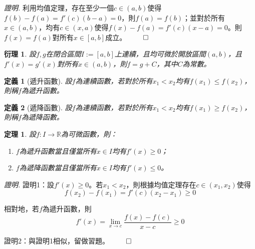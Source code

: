 \documentclass[12pt]{article}
\newtheorem{definition}{定義}
\newtheorem*{theorem}{定理}
\newtheorem*{corollary}{衍理}
\renewenvironment*{proof}{\textit{證明.}}{\hfill$\qed$}
\begin{document}
    \begin{proof}
        利用均值定理，存在至少一個$c\in(a,b)$使得$f(b)-f(a)=f'(c)(b-a)=0$，則$f(a)=f(b)$；並對於所有$x\in(a,b)$，均有$c\in(x,a)$使得$f(x)-f(a)=f'(c)(x-a)=0$。則$f(x)=f(a)$對所有$x\in[a,b]$成立。
    \end{proof}

    \begin{corollary}
        設$f,g$在閉合區間$I:=[a,b]$上連續，且均可微於開放區間$(a,b)$，且$f'(x)=g'(x)$對所有$x\in(a,b)$，則$f=g+C$，其中$C$為常數。
    \end{corollary}

    \begin{definition}[遞升函數]
        設$f$為連續函數，若對於所有$x_1<x_2$均有$f(x_1)\leq f(x_2)$，則稱$f$為遞升函數。
    \end{definition}

    \begin{definition}[遞降函數]
        設$f$為連續函數，若對於所有$x_1<x_2$均有$f(x_1)\geq f(x_2)$，則稱$f$為遞降函數。
    \end{definition}

    \begin{theorem}
        設$f:I\to\mathbb{R}$為可微函數，則：\begin{enumerate}
            \item $f$為遞升函數當且僅當所有$x\in I$均有$f'(x)\geq 0$；
            \item $f$為遞降函數當且僅當所有$x\in I$均有$f'(x)\leq 0$。
        \end{enumerate}
    \end{theorem}

    \begin{proof}
        證明1：設$f'(x)\geq 0$。若$x_1<x_2$，則根據均值定理存在$c\in(x_1,x_2)$使得$$f(x_2)-f(x_1)=f'(c)(x_2-x_1)\geq 0$$
        
        相對地，若$f$為遞升函數，則$$f'(x)=\lim_{x\to c}\frac{f(x)-f(c)}{x-c}\geq 0$$

        證明2：與證明1相似，留做習題。
    \end{proof}
\end{document}
